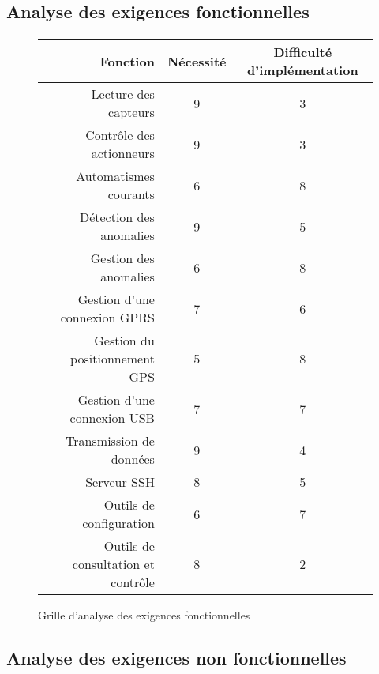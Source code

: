 \documentclass[a4paper, 11pt, final]{article}
\begin{document}
\subsection{Analyse des exigences fonctionnelles}

\paragraph{}
\begin{figure}[h!]
\begin{center}
\begin{tabular}{|r|c|c|}
\hline
Fonction & Nécessité & Difficulté d'implémentation\\ \hline \hline
Lecture des capteurs	& 9 & 3\\ \hline
Contrôle des actionneurs & 9 & 3\\ \hline
Automatismes courants & 6 & 8\\ \hline
\hline
Détection des anomalies & 9 & 5\\ \hline
Gestion des anomalies & 6 & 8\\ \hline
\hline
Gestion d'une connexion GPRS & 7 & 6\\ \hline
Gestion du positionnement GPS & 5 & 8\\ \hline
Gestion d'une connexion USB & 7 & 7\\ \hline
Transmission de données & 9 & 4\\ \hline
\hline

Serveur SSH & 8 & 5\\ \hline
Outils de configuration & 6 & 7\\ \hline
Outils de consultation et contrôle & 8 & 2\\ \hline
\end{tabular}
\end{center}
\caption{Grille d'analyse des exigences fonctionnelles}
\end{figure}
\FloatBarrier

\pagebreak

\subsection{Analyse des exigences non fonctionnelles}
\end{document}
